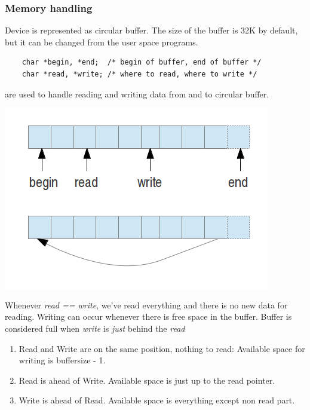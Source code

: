 \documentclass[11pt]{report}
\begin{document}
\subsubsection{Memory handling}
Device is represented as circular buffer. The size of the buffer is 32K by default, but it can be changed from the user space programs.
\begin{verbatim}
	char *begin, *end;	/* begin of buffer, end of buffer */
	char *read, *write;	/* where to read, where to write */
\end{verbatim}
are used to handle reading and writing data from and to circular buffer.

\includegraphics[scale=0.5]{Buffer}

Whenever \emph{read == write}, we've read everything and there is no new data for reading. Writing can occur whenever there is free space in the buffer. Buffer is considered full when \emph{write} is \emph{just} behind the \emph{read}
\begin{enumerate}
\item Read and Write are on the same position, nothing to read: Available space for writing is buffersize - 1.
\item Read is ahead of Write. Available space is just up to the read pointer.
\item Write is ahead of Read. Available space is everything except non read part.
\end{enumerate}
\end{document}
